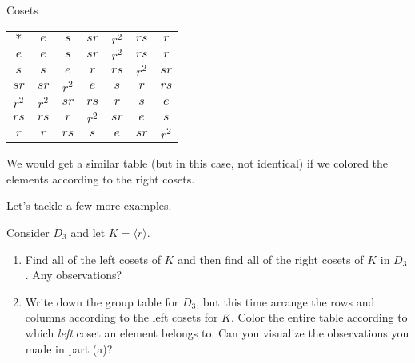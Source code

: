 \begin{section}{Cosets}
\begin{center}
\begin{tabular}{c!{\vrule width 2pt}c|c|c|c|c|c}
$*$ & $e$ & $s$ & $sr$ & $r^2$ & $rs$ & $r$ \\ 
$e$ & $e$ & $s$ & $sr$ & $r^2$ & $rs$ & $r$\\
\hline $s$ & $s$ & $e$ & $r$ & $rs$ & $r^2$ & $sr$ \\
\hline $sr$ & $sr$ & $r^2$ & $e$ & $s$ & $r$ & $rs$\\
\hline $r^2$ & $r^2$ & $sr$ & $rs$ & $r$ & $s$ & $e$\\
\hline $rs$ & $rs$ & $r$ & $r^2$ & $sr$ & $e$ & $s$\\
\hline $r$ & $r$ & $rs$ & $s$ & $e$ & $sr$ & $r^2$\\
\end{tabular}
\end{center}
We would get a similar table (but in this case, not identical) if we colored the elements according to the right cosets.

Let's tackle a few more examples.

\begin{problem}\label{prob:normal_in_D3}
Consider $D_3$ and let $K=\langle r\rangle$.  
\begin{enumerate}[label=\textrm{(\alph*)}]
\item Find all of the left cosets of $K$ and then find all of the right cosets of $K$ in $D_3$.  Any observations?
\item Write down the group table for $D_3$, but this time arrange the rows and columns according to the left cosets for $K$.  Color the entire table according to which \emph{left} coset an element belongs to.  Can you visualize the observations you made in part (a)?
\end{enumerate}
\end{problem}


\end{section}
